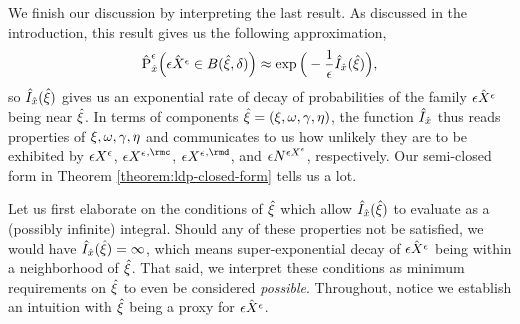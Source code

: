 We finish our discussion by interpreting the last result.
As discussed in the introduction, this result gives us the following approximation,
\begin{equation*}
  \hat{{\operatorname{P}}}^\epsilon_{\hat{x}}\Big( \hat{\epsilon X^\epsilon} \in {B(\hat{\xi},\delta)} \Big) 
  \approx \exp\Big(-\frac1\epsilon \hat{I}_{\hat{x}}(\hat{\xi}) \Big),
\end{equation*}
so $\hat{I}_{\hat{x}}(\hat{\xi})$ gives us an exponential rate of decay of probabilities of the family $\hat{\epsilon X^\epsilon}$ being near $\hat{\xi}$.
In terms of components $\hat{\xi} = (\xi, \omega, \gamma, \eta)$, the function $\hat{I}_{\hat{x}}$ thus reads properties of $\xi, \omega, \gamma, \eta$ and communicates to us how unlikely they are to be exhibited by $\epsilon X^\epsilon$, ${\Xe}^{,\rmc}$, ${\Xe}^{,\rmd}$, and $\epsilon N^{\epsilon X^\epsilon}$, respectively.
Our semi-closed form in Theorem \ref{theorem:ldp-closed-form} tells us a lot.

Let us first elaborate on the conditions of $\hat{\xi}$ which allow $\hat{I}_{\hat{x}}(\hat{\xi})$ to evaluate as a (possibly infinite) integral.
Should any of these properties not be satisfied, we would have $\hat{I}_{\hat{x}}(\hat{\xi}) = \infty$, which means super-exponential decay of $\hat{\epsilon X^\epsilon}$ being within a neighborhood of $\hat{\xi}$.
That said, we interpret these conditions as minimum requirements on $\hat{\xi}$ to even be considered \emph{possible}.
Throughout, notice we establish an intuition with $\hat{\xi}$ being a proxy for $\hat{\epsilon X^\epsilon}$.

